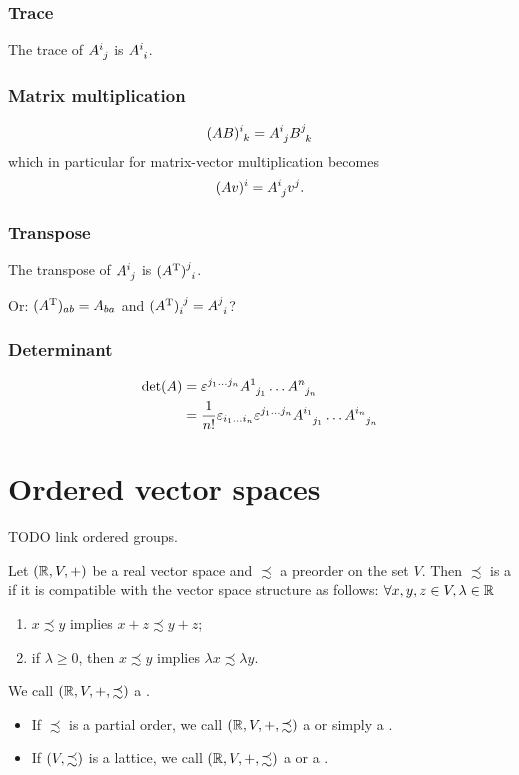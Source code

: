 \subsection{Trace}
The trace of $\tensor{A}{^i_j}$ is $\tensor{A}{^i_i}$.
\subsection{Matrix multiplication}
\[ \tensor{(AB)}{^{i}_{k}}=\tensor{A}{^{i}_{j}}\tensor{B}{^{j}_{k}} \]
which in particular for matrix-vector multiplication becomes
\[ (Av)^i = \tensor{A}{^i_j} v^j. \]
\subsection{Transpose}
The transpose of $\tensor{A}{^i_j}$ is $\tensor{(A^\transp)}{^j_i}$.

Or: $(A^{\mathrm{T}})_{ab} = A_{ba}$ and $\tensor{(A^\transp)}{_i^j} = \tensor{A}{^j_i}$?
\subsection{Determinant}
\begin{align*}
\det(A) &= \varepsilon^{j_1\ldots j_n}\tensor{A}{^{1}_{j_1}}\ldots \tensor{A}{^{n}_{j_n}} \\
&= \frac{1}{n!}\varepsilon_{i_1\ldots i_n}\varepsilon^{j_1\ldots j_n}\tensor{A}{^{i_1}_{j_1}}\ldots \tensor{A}{^{i_n}_{j_n}}
\end{align*}

\chapter{Ordered vector spaces}
TODO link ordered groups.
\begin{definition}
Let $\sSet{\R, V, +}$ be a real vector space and $\precsim$ a preorder on the set $V$. Then $\precsim$ is a  if it is compatible with the vector space structure as follows: $\forall x,y,z\in V, \lambda\in\mathbb{R}$
\begin{enumerate}
\item $x\precsim y$ implies $x+z \precsim y+z$;
\item if $\lambda\geq 0$, then $x \precsim y$ implies $\lambda x \precsim \lambda y$.
\end{enumerate}
We call $(\mathbb{R}, V, +, \precsim)$ a .

\begin{itemize}
\item If $\precsim$ is a partial order, we call $(\mathbb{R}, V, +, \precsim)$ a  or simply a .
\item If $\sSet{V, \precsim}$ is a lattice, we call $(\mathbb{R}, V, +, \precsim)$ a  or a .
\end{itemize}
\end{definition}

